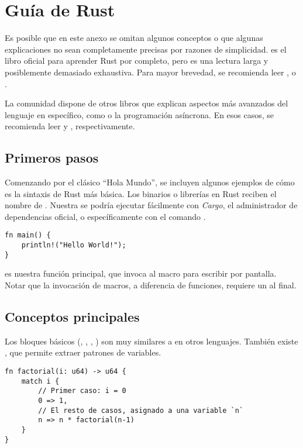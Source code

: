 \chapter{Guía de Rust}\label{annex:rust}

Es posible que en este anexo se omitan algunos conceptos o que algunas
explicaciones no sean completamente precisas por razones de simplicidad.
 es el libro oficial para aprender Rust por completo, pero es
una lectura larga y posiblemente demasiado exhaustiva. Para mayor brevedad, se
recomienda leer ,  o
.

La comunidad dispone de otros libros que explican aspectos más avanzados del
lenguaje en específico, como \unsafe o la programación asíncrona. En esos casos,
se recomienda leer  y ,
respectivamente.

\section{Primeros pasos}

Comenzando por el clásico ``Hola Mundo'', se incluyen algunos ejemplos de cómo
es la sintaxis de Rust más básica. Los binarios o librerías en Rust reciben el
nombre de \crate. Nuestra \crate se podría ejecutar fácilmente con \emph{Cargo},
el administrador de dependencias oficial, o específicamente con el comando
.

\begin{verbatim}
fn main() {
    println!("Hello World!");
}
\end{verbatim}

 es nuestra función principal, que invoca al macro 
para escribir por pantalla. Notar que la invocación de macros, a diferencia de
funciones, requiere un \rust{!} al final.

\section{Conceptos principales}

Los bloques básicos (, , , ) son muy
similares a en otros lenguajes. También existe , que permite extraer
patrones de variables.

\begin{verbatim}
fn factorial(i: u64) -> u64 {
    match i {
        // Primer caso: i = 0
        0 => 1,
        // El resto de casos, asignado a una variable `n`
        n => n * factorial(n-1)
    }
}
\end{verbatim}

